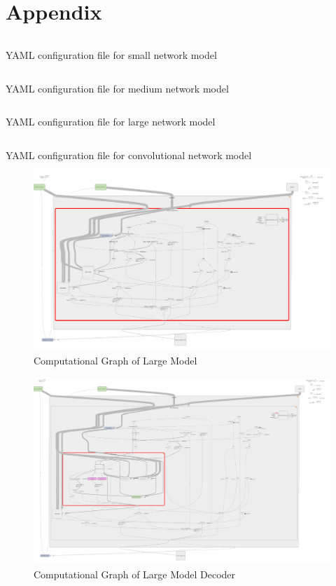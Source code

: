 \documentclass[pageno]{jpaper}
\begin{document}
\section{Appendix}
\begin{singlespace}
\begin{listing}
\inputminted[]{YAML}{../config/small_config.yaml}
\caption{YAML configuration file for small network model}
\end{listing}
\pagebreak

\begin{listing}
\inputminted[]{YAML}{../config/medium_config.yaml}
\caption{YAML configuration file for medium network model}
\end{listing}
\pagebreak

\begin{listing}
\inputminted[]{YAML}{../config/large_config.yaml}
\caption{YAML configuration file for large network model}
\end{listing}
\pagebreak

\begin{listing}
	\inputminted[]{YAML}{../config/conv_config.yaml}
	\caption{YAML configuration file for convolutional network model}
\end{listing}
\pagebreak
\end{singlespace}

\pagebreak
\begin{figure}[H]
	\centering
	\includegraphics[scale=0.13, angle=90]{small_model_full_graph.png}
	\caption{Computational Graph of Large Model}
	\label{fg:small_model_graph}
\end{figure}
\pagebreak

\begin{figure}[H]
	\centering
	\includegraphics[scale=0.103, angle=90]{small_graph_decoder.png}
	\caption{Computational Graph of Large Model Decoder}
	\label{fg:large_model_decoder_graph}
\end{figure}
\end{document}
